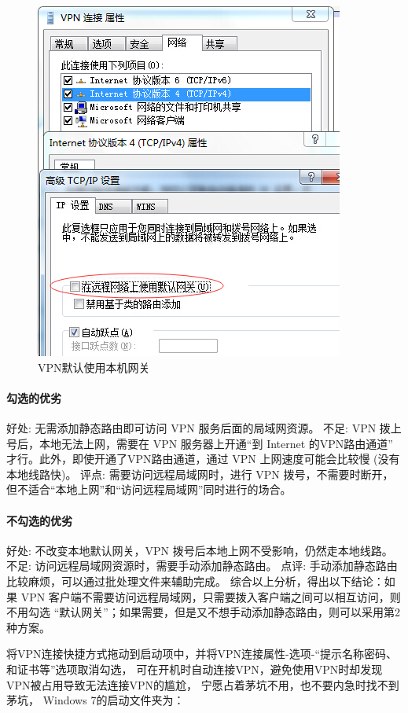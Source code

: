 \documentclass{book}
\begin{document}
\begin{figure}[htbp]
	\centering
	\includegraphics[scale=0.8]{UsingInternetWhenConnectVPN.jpg}
	\caption{VPN默认使用本机网关}
	\label{fig:UsingInternetWhenConnectVPN}
\end{figure}

\paragraph{勾选的优劣}好处: 无需添加静态路由即可访问 VPN 服务后面的局域网资源。
不足: VPN 拨上号后，本地无法上网，需要在 VPN 服务器上开通“到 Internet 的VPN路由通道” 才行。此外，即使开通了VPN路由通道，通过 VPN 上网速度可能会比较慢 (没有本地线路快)。
评点: 需要访问远程局域网时，进行 VPN 拨号，不需要时断开，但不适合“本地上网”和“访问远程局域网”同时进行的场合。

\paragraph{不勾选的优劣}

好处: 不改变本地默认网关，VPN 拨号后本地上网不受影响，仍然走本地线路。
不足: 访问远程局域网资源时，需要手动添加静态路由。
点评: 手动添加静态路由比较麻烦，可以通过批处理文件来辅助完成。
综合以上分析，得出以下结论：如果 VPN 客户端不需要访问远程局域网，只需要拨入客户端之间可以相互访问，则不用勾选 “默认网关”；如果需要，但是又不想手动添加静态路由，则可以采用第2种方案。

将VPN连接快捷方式拖动到启动项中，并将VPN连接属性-选项-“提示名称密码、和证书等”选项取消勾选，
可在开机时自动连接VPN，避免使用VPN时却发现VPN被占用导致无法连接VPN的尴尬，
宁愿占着茅坑不用，也不要内急时找不到茅坑，
Windows 7的启动文件夹为：
\end{document}
